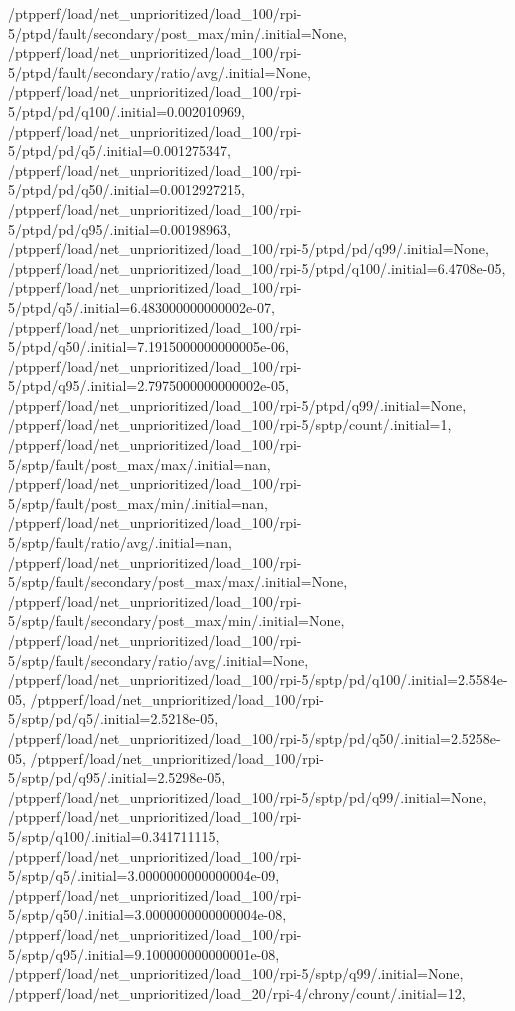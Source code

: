 {    /ptpperf/load/net_unprioritized/load_100/rpi-5/ptpd/fault/secondary/post_max/min/.initial=None,
    /ptpperf/load/net_unprioritized/load_100/rpi-5/ptpd/fault/secondary/ratio/avg/.initial=None,
    /ptpperf/load/net_unprioritized/load_100/rpi-5/ptpd/pd/q100/.initial=0.002010969,
    /ptpperf/load/net_unprioritized/load_100/rpi-5/ptpd/pd/q5/.initial=0.001275347,
    /ptpperf/load/net_unprioritized/load_100/rpi-5/ptpd/pd/q50/.initial=0.0012927215,
    /ptpperf/load/net_unprioritized/load_100/rpi-5/ptpd/pd/q95/.initial=0.00198963,
    /ptpperf/load/net_unprioritized/load_100/rpi-5/ptpd/pd/q99/.initial=None,
    /ptpperf/load/net_unprioritized/load_100/rpi-5/ptpd/q100/.initial=6.4708e-05,
    /ptpperf/load/net_unprioritized/load_100/rpi-5/ptpd/q5/.initial=6.483000000000002e-07,
    /ptpperf/load/net_unprioritized/load_100/rpi-5/ptpd/q50/.initial=7.1915000000000005e-06,
    /ptpperf/load/net_unprioritized/load_100/rpi-5/ptpd/q95/.initial=2.7975000000000002e-05,
    /ptpperf/load/net_unprioritized/load_100/rpi-5/ptpd/q99/.initial=None,
    /ptpperf/load/net_unprioritized/load_100/rpi-5/sptp/count/.initial=1,
    /ptpperf/load/net_unprioritized/load_100/rpi-5/sptp/fault/post_max/max/.initial=nan,
    /ptpperf/load/net_unprioritized/load_100/rpi-5/sptp/fault/post_max/min/.initial=nan,
    /ptpperf/load/net_unprioritized/load_100/rpi-5/sptp/fault/ratio/avg/.initial=nan,
    /ptpperf/load/net_unprioritized/load_100/rpi-5/sptp/fault/secondary/post_max/max/.initial=None,
    /ptpperf/load/net_unprioritized/load_100/rpi-5/sptp/fault/secondary/post_max/min/.initial=None,
    /ptpperf/load/net_unprioritized/load_100/rpi-5/sptp/fault/secondary/ratio/avg/.initial=None,
    /ptpperf/load/net_unprioritized/load_100/rpi-5/sptp/pd/q100/.initial=2.5584e-05,
    /ptpperf/load/net_unprioritized/load_100/rpi-5/sptp/pd/q5/.initial=2.5218e-05,
    /ptpperf/load/net_unprioritized/load_100/rpi-5/sptp/pd/q50/.initial=2.5258e-05,
    /ptpperf/load/net_unprioritized/load_100/rpi-5/sptp/pd/q95/.initial=2.5298e-05,
    /ptpperf/load/net_unprioritized/load_100/rpi-5/sptp/pd/q99/.initial=None,
    /ptpperf/load/net_unprioritized/load_100/rpi-5/sptp/q100/.initial=0.341711115,
    /ptpperf/load/net_unprioritized/load_100/rpi-5/sptp/q5/.initial=3.0000000000000004e-09,
    /ptpperf/load/net_unprioritized/load_100/rpi-5/sptp/q50/.initial=3.0000000000000004e-08,
    /ptpperf/load/net_unprioritized/load_100/rpi-5/sptp/q95/.initial=9.100000000000001e-08,
    /ptpperf/load/net_unprioritized/load_100/rpi-5/sptp/q99/.initial=None,
    /ptpperf/load/net_unprioritized/load_20/rpi-4/chrony/count/.initial=12,
}
